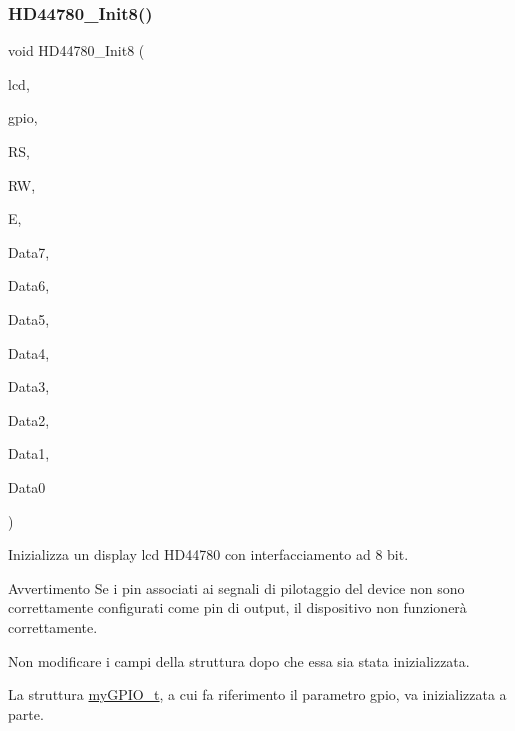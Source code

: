 \subsubsection{\texorpdfstring{H\+D44780\+\_\+\+Init8()}{HD44780\_Init8()}}
{\footnotesize\ttfamily void H\+D44780\+\_\+\+Init8 (\begin{DoxyParamCaption}\item[{\hyperlink{struct_h_d44780___l_c_d__t}{H\+D44780\+\_\+\+L\+C\+D\+\_\+t} $\ast$}]{lcd,  }\item[{\hyperlink{structmy_g_p_i_o__t}{my\+G\+P\+I\+O\+\_\+t} $\ast$}]{gpio,  }\item[{\hyperlink{group__bare-metal_ga402a0d20afc0cb7c25554b8b023f4253}{my\+G\+P\+I\+O\+\_\+mask}}]{RS,  }\item[{\hyperlink{group__bare-metal_ga402a0d20afc0cb7c25554b8b023f4253}{my\+G\+P\+I\+O\+\_\+mask}}]{RW,  }\item[{\hyperlink{group__bare-metal_ga402a0d20afc0cb7c25554b8b023f4253}{my\+G\+P\+I\+O\+\_\+mask}}]{E,  }\item[{\hyperlink{group__bare-metal_ga402a0d20afc0cb7c25554b8b023f4253}{my\+G\+P\+I\+O\+\_\+mask}}]{Data7,  }\item[{\hyperlink{group__bare-metal_ga402a0d20afc0cb7c25554b8b023f4253}{my\+G\+P\+I\+O\+\_\+mask}}]{Data6,  }\item[{\hyperlink{group__bare-metal_ga402a0d20afc0cb7c25554b8b023f4253}{my\+G\+P\+I\+O\+\_\+mask}}]{Data5,  }\item[{\hyperlink{group__bare-metal_ga402a0d20afc0cb7c25554b8b023f4253}{my\+G\+P\+I\+O\+\_\+mask}}]{Data4,  }\item[{\hyperlink{group__bare-metal_ga402a0d20afc0cb7c25554b8b023f4253}{my\+G\+P\+I\+O\+\_\+mask}}]{Data3,  }\item[{\hyperlink{group__bare-metal_ga402a0d20afc0cb7c25554b8b023f4253}{my\+G\+P\+I\+O\+\_\+mask}}]{Data2,  }\item[{\hyperlink{group__bare-metal_ga402a0d20afc0cb7c25554b8b023f4253}{my\+G\+P\+I\+O\+\_\+mask}}]{Data1,  }\item[{\hyperlink{group__bare-metal_ga402a0d20afc0cb7c25554b8b023f4253}{my\+G\+P\+I\+O\+\_\+mask}}]{Data0 }\end{DoxyParamCaption})}



Inizializza un display lcd H\+D44780 con interfacciamento ad 8 bit. 

\begin{DoxyWarning}{Avvertimento}
Se i pin associati ai segnali di pilotaggio del device non sono correttamente configurati come pin di output, il dispositivo non funzionerà correttamente.

Non modificare i campi della struttura dopo che essa sia stata inizializzata.

La struttura \hyperlink{structmy_g_p_i_o__t}{my\+G\+P\+I\+O\+\_\+t}, a cui fa riferimento il parametro gpio, va inizializzata a parte.
\end{DoxyWarning}

